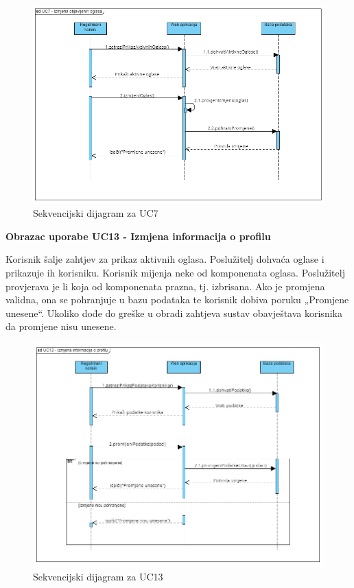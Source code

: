 					\begin{figure}[H]
						\includegraphics[scale=0.7]{dijagrami/SD_IzmjenaOglasa.png}
						\centering
						\caption{Sekvencijski dijagram za UC7}
						\label{fig:SD_IzmjenaOglasa}
					\end{figure}
					
			\eject
			
					\noindent \textbf{Obrazac uporabe UC13 - Izmjena informacija o profilu}
					
					\noindent Korisnik šalje zahtjev za prikaz aktivnih oglasa. Poslužitelj dohvaća oglase i prikazuje ih korisniku. Korisnik mijenja neke od komponenata oglasa. Poslužitelj provjerava je li koja od komponenata prazna, tj. izbrisana. Ako je promjena validna, ona se pohranjuje u bazu podataka te korisnik dobiva poruku „Promjene unesene“. Ukoliko dođe do greške u obradi zahtjeva sustav obavještava korisnika da promjene nisu unesene.
					
					\begin{figure}[H]
						\includegraphics[scale=0.7]{dijagrami/SD_IzmjenaInf.png}
						\centering
						\caption{Sekvencijski dijagram za UC13}
						\label{fig:SD_IzmjenaInf}
					\end{figure}
					
